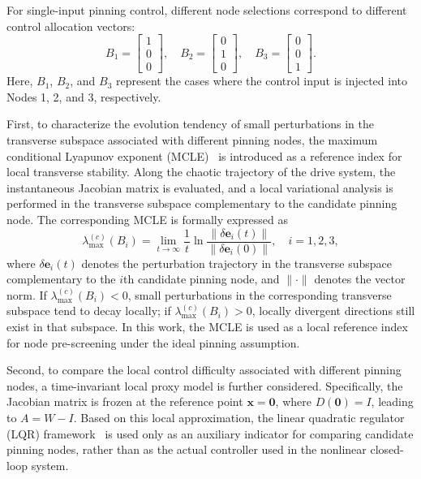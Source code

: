 \documentclass[10pt,twocolumn]{article}
\theoremstyle{definition}
\begin{document}
For single-input pinning control, different node selections correspond to different control allocation vectors:
\begin{equation}
	B_1=
	\begin{bmatrix}
		1\\0\\0
	\end{bmatrix},
	\quad
	B_2=
	\begin{bmatrix}
		0\\1\\0
	\end{bmatrix},
	\quad
	B_3=
	\begin{bmatrix}
		0\\0\\1
	\end{bmatrix}.
	\label{eq:pinning_vectors}
\end{equation}
Here, $B_1$, $B_2$, and $B_3$ represent the cases where the control input is injected into Nodes 1, 2, and 3, respectively.

First, to characterize the evolution tendency of small perturbations in the transverse subspace associated with different pinning nodes, the maximum conditional Lyapunov exponent (MCLE)~\cite{pecora1998master} is introduced as a reference index for local transverse stability. Along the chaotic trajectory of the drive system, the instantaneous Jacobian matrix is evaluated, and a local variational analysis is performed in the transverse subspace complementary to the candidate pinning node. The corresponding MCLE is formally expressed as
\begin{equation}
	\lambda_{\max}^{(c)}(B_i)
	=
	\lim_{t\to\infty}
	\frac{1}{t}
	\ln
	\frac{\|\delta\mathbf{e}_i(t)\|}
	{\|\delta\mathbf{e}_i(0)\|},
	\quad i=1,2,3,
	\label{eq:mcle}
\end{equation}
where $\delta\mathbf{e}_i(t)$ denotes the perturbation trajectory in the transverse subspace complementary to the $i$th candidate pinning node, and $\|\cdot\|$ denotes the vector norm. If $\lambda_{\max}^{(c)}(B_i)<0$, small perturbations in the corresponding transverse subspace tend to decay locally; if $\lambda_{\max}^{(c)}(B_i)>0$, locally divergent directions still exist in that subspace. In this work, the MCLE is used as a local reference index for node pre-screening under the ideal pinning assumption.

Second, to compare the local control difficulty associated with different pinning nodes, a time-invariant local proxy model is further considered. Specifically, the Jacobian matrix is frozen at the reference point $\mathbf{x}=\mathbf{0}$, where $D(\mathbf{0})=I$, leading to $A=W-I$. Based on this local approximation, the linear quadratic regulator (LQR) framework~\cite{willems2003least} is used only as an auxiliary indicator for comparing candidate pinning nodes, rather than as the actual controller used in the nonlinear closed-loop system.
\end{document}
